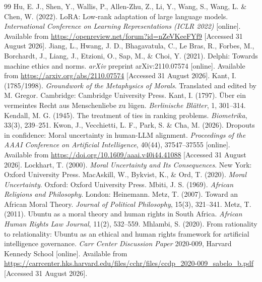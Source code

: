 \documentclass[10pt,twocolumn,a4paper]{article}
\begin{document}
\begin{thebibliography}{99}
 Hu, E. J., Shen, Y., Wallis, P., Allen-Zhu, Z., Li, Y., Wang, S., Wang, L. \& Chen, W. (2022). LoRA: Low-rank adaptation of large language models. \textit{International Conference on Learning Representations (ICLR 2022)} [online]. Available from \url{https://openreview.net/forum?id=nZeVKeeFYf9} [Accessed 31 August 2026].
 Jiang, L., Hwang, J. D., Bhagavatula, C., Le Bras, R., Forbes, M., Borchardt, J., Liang, J., Etzioni, O., Sap, M., \& Choi, Y. (2021). Delphi: Towards machine ethics and norms. \textit{arXiv} preprint arXiv:2110.07574 [online]. Available from \url{https://arxiv.org/abs/2110.07574} [Accessed 31 August 2026].
 Kant, I. (1785/1998). \textit{Groundwork of the Metaphysics of Morals}. Translated and edited by M. Gregor. Cambridge: Cambridge University Press.
 Kant, I. (1797). \"{U}ber ein vermeintes Recht aus Menschenliebe zu l\"{u}gen. \textit{Berlinische Bl\"{a}tter}, 1, 301--314.
 Kendall, M. G. (1945). The treatment of ties in ranking problems. \textit{Biometrika}, 33(3), 239--251.
 Kwon, J., Vecchietti, L. F., Park, S. \& Cha, M. (2026). Dropouts in confidence: Moral uncertainty in human-LLM alignment. \textit{Proceedings of the AAAI Conference on Artificial Intelligence}, 40(44), 37547--37555 [online]. Available from \url{https://doi.org/10.1609/aaai.v40i44.41088} [Accessed 31 August 2026].
 Lockhart, T. (2000). \textit{Moral Uncertainty and Its Consequences}. New York: Oxford University Press.
 MacAskill, W., Bykvist, K., \& Ord, T. (2020). \textit{Moral Uncertainty}. Oxford: Oxford University Press.
 Mbiti, J. S. (1969). \textit{African Religions and Philosophy}. London: Heinemann.
 Metz, T. (2007). Toward an African Moral Theory. \textit{Journal of Political Philosophy}, 15(3), 321--341.
 Metz, T. (2011). Ubuntu as a moral theory and human rights in South Africa. \textit{African Human Rights Law Journal}, 11(2), 532--559.
 Mhlambi, S. (2020). From rationality to relationality: Ubuntu as an ethical and human rights framework for artificial intelligence governance. \textit{Carr Center Discussion Paper} 2020-009, Harvard Kennedy School [online]. Available from \url{https://carrcenter.hks.harvard.edu/files/cchr/files/ccdp_2020-009_sabelo_b.pdf} [Accessed 31 August 2026].

\end{thebibliography}
\end{document}
